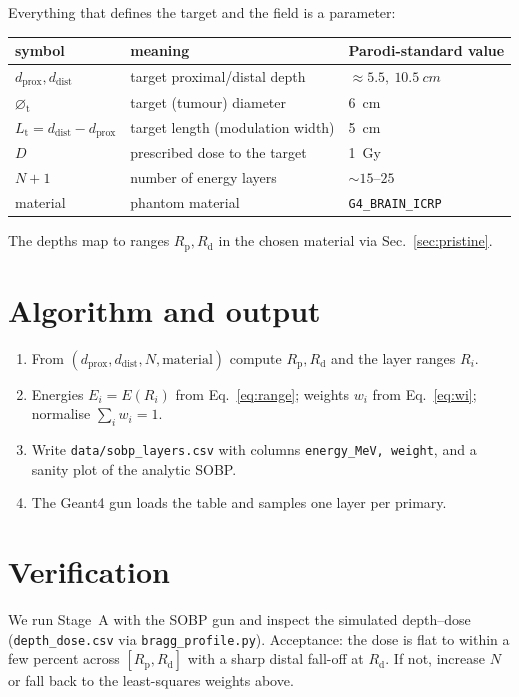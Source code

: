 \documentclass[11pt]{article}
\newcommand{\Rd}{R_{\mathrm d}}
\newcommand{\Rp}{R_{\mathrm p}}
\begin{document}
Everything that defines the target and the field is a parameter:
\begin{center}
\begin{tabular}{lll}
\toprule
symbol & meaning & Parodi-standard value \\
\midrule
$d_{\mathrm{prox}},d_{\mathrm{dist}}$ & target proximal/distal depth & $\approx 5.5,\ \SI{10.5}{cm}$ \\
$\varnothing_{\mathrm t}$ & target (tumour) diameter & \SI{6}{cm} \\
$L_{\mathrm t}=d_{\mathrm{dist}}-d_{\mathrm{prox}}$ & target length (modulation width) & \SI{5}{cm} \\
$D$ & prescribed dose to the target & \SI{1}{Gy} \\
$N{+}1$ & number of energy layers & $\sim 15$--$25$ \\
material & phantom material & \texttt{G4\_BRAIN\_ICRP} \\
\bottomrule
\end{tabular}
\end{center}
The depths map to ranges $\Rp,\Rd$ in the chosen material via Sec.~\ref{sec:pristine}.

\section{Algorithm and output}

\begin{enumerate}[nosep]
\item From $(d_{\mathrm{prox}},d_{\mathrm{dist}},N,\text{material})$ compute
$\Rp,\Rd$ and the layer ranges $R_i$.
\item Energies $E_i=E(R_i)$ from Eq.~\eqref{eq:range}; weights $w_i$ from
Eq.~\eqref{eq:wi}; normalise $\sum_i w_i=1$.
\item Write \texttt{data/sobp\_layers.csv} with columns
\texttt{energy\_MeV,\,weight}, and a sanity plot of the analytic SOBP.
\item The Geant4 gun loads the table and samples one layer per primary.
\end{enumerate}

\section{Verification}
\label{sec:verify}

We run Stage~A with the SOBP gun and inspect the simulated depth--dose
(\texttt{depth\_dose.csv} via \texttt{bragg\_profile.py}). Acceptance: the dose
is flat to within a few percent across $[\Rp,\Rd]$ with a sharp distal fall-off
at $\Rd$. If not, increase $N$ or fall back to the least-squares weights above.
\end{document}
